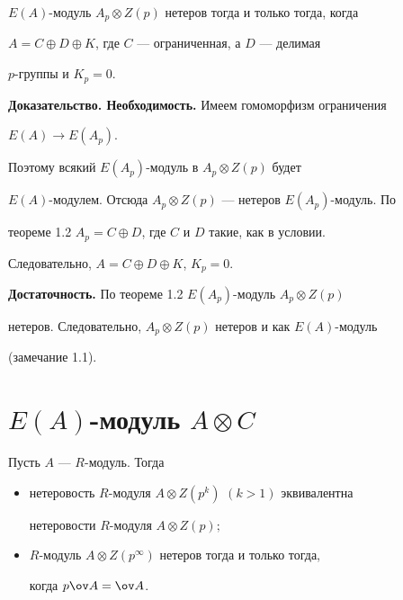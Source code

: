  


\begin{cors} 


$E(A)$-модуль $A_p\otimes Z(p)$ нетеров тогда и только тогда, когда 


$A=C\oplus D\oplus K$, где $C$ --- ограниченная, а $D$ --- делимая 


$p$-группы и $K_p=0$. 


\end{cors} 


 


{\bf Доказательство. Необходимость.} Имеем гомоморфизм ограничения 


$E(A)\to E(A_p)$. 


Поэтому всякий $E(A_p)$-модуль в $A_p\otimes Z(p)$ будет 


$E(A)$-модулем. Отсюда $A_p\otimes Z(p)$ --- нетеров $E(A_p)$-модуль. По 


теореме 1.2\; $A_p=C\oplus D$, где $C$ и $D$ такие, как в условии. 


Следовательно, $A=C\oplus D\oplus K$, $K_p=0$. 


 


{\bf Достаточность.} По теореме 1.2\; $E(A_p)$-модуль $A_p\otimes Z(p)$ 


нетеров. Следовательно, $A_p\otimes Z(p)$ нетеров и как $E(A)$-модуль 


(замечание 1.1). 


 


\section{$E(A)$-модуль $A\otimes C$} 


 


\begin{lems} 


Пусть $A$ --- $R$-модуль. Тогда 


\begin{itemize} 


\item[1)] нетеровость $R$-модуля $A\otimes Z(p^k)$ $(k>1)$ эквивалентна 


нетеровости $R$-модуля $A\otimes Z(p);$ 


\item[2)] $R$-модуль $A\otimes Z(p^\infty)$ нетеров тогда и только тогда, 


когда $p\ov A=\ov A$. 


\end{itemize} 


\end{lems} 



